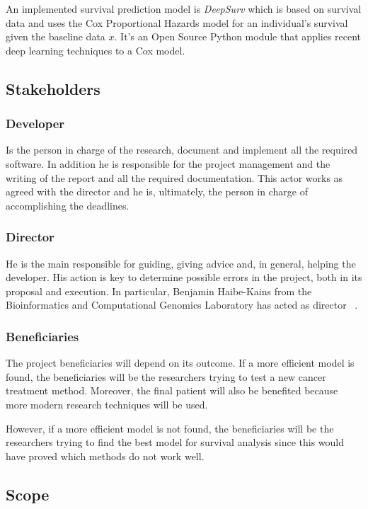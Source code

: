 An implemented survival prediction model is \emph{DeepSurv} which is based on survival data
and uses the Cox Proportional Hazards model for an individual's survival given the baseline data
\( x \). It's an Open Source Python module that applies recent deep learning techniques 
to a Cox model.
~\cites{medical:deep-surv}{medical:cox}

\subsection{Stakeholders}

\subsubsection{Developer}
Is the person in charge of the research, document and implement all the required software.
In addition he is responsible for the project management and the writing of the report
and all the required documentation. This actor works as agreed with the director and
he is, ultimately, the person in charge of accomplishing the deadlines.

\subsubsection{Director}
He is the main responsible for guiding, giving advice and, in general, helping the developer.
His action is key to determine possible errors in the project, both in its proposal and 
execution. In particular, Benjamin Haibe-Kains from the Bioinformatics and Computational
Genomics Laboratory has acted as director
~\cites{bhklab}.

\subsubsection{Beneficiaries}
The project beneficiaries will depend on its outcome. If a more efficient model is found, the
beneficiaries will be the researchers trying to test a new cancer treatment method. Moreover,
the final patient will also be benefited because more modern research techniques will be used.

However, if a more efficient model is not found, the beneficiaries will be the researchers
trying to find the best model for survival analysis since this would have proved which 
methods do not work well.

\subsection{Scope}

